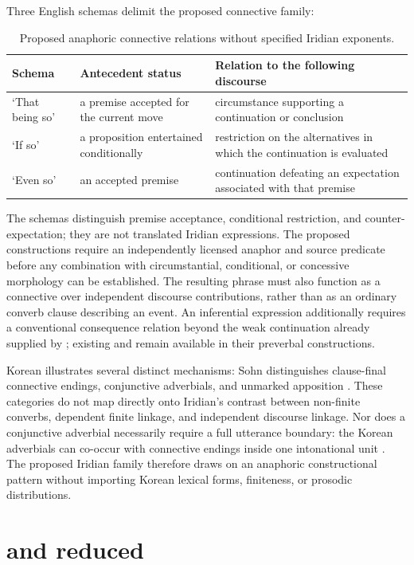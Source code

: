 Three English schemas delimit the proposed connective family:
\begin{table}[ht]
\footnotesize
\caption{Proposed anaphoric connective relations without specified Iridian exponents.}
\label{tab:proposed-anaphoric-connectives}
\begin{tabularx}{\textwidth}{l L L}
\toprule
Schema & Antecedent status & Relation to the following discourse \\
\midrule
`That being so' & a premise accepted for the current move & circumstance supporting a continuation or conclusion \\
`If so' & a proposition entertained conditionally & restriction on the alternatives in which the continuation is evaluated \\
`Even so' & an accepted premise & continuation defeating an expectation associated with that premise \\
\bottomrule
\end{tabularx}
\end{table}

The schemas distinguish premise acceptance, conditional restriction, and
counter-expectation; they are not translated Iridian expressions. The proposed
constructions require an independently licensed anaphor and source predicate
before any combination with circumstantial, conditional, or concessive
morphology can be established. The resulting phrase must also function as a
connective over independent discourse contributions, rather than as an ordinary
converb clause describing an event. An inferential expression additionally
requires a conventional consequence relation beyond the weak continuation
already supplied by
; existing  and  remain available in their
preverbal constructions.

Korean illustrates several distinct mechanisms: Sohn distinguishes
clause-final connective endings, conjunctive adverbials, and unmarked
apposition \cite[291--292]{sohn2009}. These categories do not map directly
onto Iridian's contrast between non-finite converbs, dependent finite
linkage, and independent discourse linkage. Nor does a conjunctive adverbial
necessarily require a full utterance boundary: the Korean adverbials can
co-occur with connective endings inside one intonational unit
\cite[290]{sohn2009}. The proposed Iridian family therefore draws on an
anaphoric constructional pattern without importing Korean lexical forms,
finiteness, or prosodic distributions.

\section{ and reduced }\label{sec:spoken-zema}

